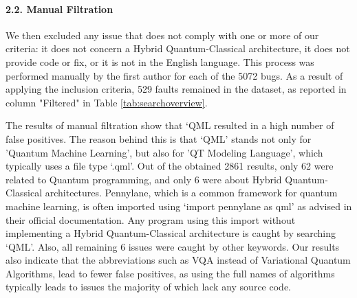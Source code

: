 
\paragraph*{2.2. Manual Filtration}
We then excluded any issue that does not comply with one or more of our criteria: it does not concern a Hybrid Quantum-Classical architecture, it does not provide code or fix, or it is not in the English language. This process was performed manually by the first author for each of the 5072 bugs. As a result of applying the inclusion criteria, 529 faults remained in the dataset, as reported in column "Filtered" in Table \ref{tab:searchoverview}. 



The results of manual filtration show that `QML resulted in a high number of false positives. The reason behind this is that `QML' stands not only for 'Quantum Machine Learning', but also for 'QT Modeling Language', which typically uses a file type `.qml'. Out of the obtained 2861 results, only 62 were related to Quantum programming, and only 6 were about Hybrid Quantum-Classical architectures. Pennylane, which is a common framework for quantum machine learning, is often imported using `import pennylane as qml' as advised in their official documentation. Any program using this import without implementing a Hybrid Quantum-Classical architecture is caught by searching `QML'. Also, all remaining 6 issues were caught by other keywords. 
Our results also indicate that the abbreviations such as VQA instead of Variational Quantum Algorithms, lead to fewer false positives, as using the full names of algorithms typically leads to issues the majority of which lack any source code. 

